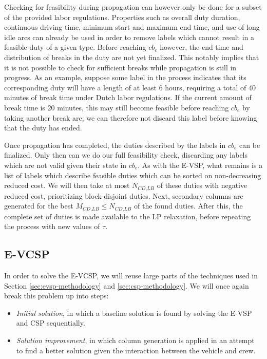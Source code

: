 \documentclass[]{article}
\begin{document}
Checking for feasibility during propagation can however only be done for a subset of the provided labor regulations. Properties such as overall duty duration, continuous driving time, minimum start and maximum end time, and use of long idle arcs can already be used in order to remove labels which cannot result in a feasible duty of a given type. Before reaching $cb_e$ however, the end time and distribution of breaks in the duty are not yet finalized. This notably implies that it is not possible to check for sufficient breaks while propagation is still in progress. As an example, suppose some label in the process indicates that its corresponding duty will have a length of at least 6 hours, requiring a total of 40 minutes of break time under Dutch labor regulations. If the current amount of break time is 20 minutes, this may still become feasible before reaching $cb_e$ by taking another break arc; we can therefore not discard this label before knowing that the duty has ended.  

Once propagation has completed, the duties described by the labels in $cb_e$ can be finalized. Only then can we do our full feasibility check, discarding any labels which are not valid given their state in $cb_e$. As with the E-VSP, what remains is a list of labels which describe feasible duties which can be sorted on non-decreasing reduced cost. We will then take at most $N_{\textit{CD,LB}}$ of these duties with negative reduced cost, prioritizing block-disjoint duties. Next, secondary columns are generated for the best $M_{\textit{CD,LB}} \leq N_{\textit{CD,LB}}$ of the found duties. After this, the complete set of duties is made available to the LP relaxation, before repeating the process with new values of $\tau$. 

\subsection{E-VCSP}
In order to solve the E-VCSP, we will reuse large parts of the techniques used in Section \ref{sec:evsp-methodology} and \ref{sec:csp-methodology}. We will once again break this problem up into steps: 
\begin{itemize}
  \item \textit{Initial solution}, in which a baseline solution is found by solving the E-VSP and CSP sequentially.
  \item \textit{Solution improvement}, in which column generation is applied in an attempt to find a better solution given the interaction between the vehicle and crew.
\end{itemize}
\end{document}
